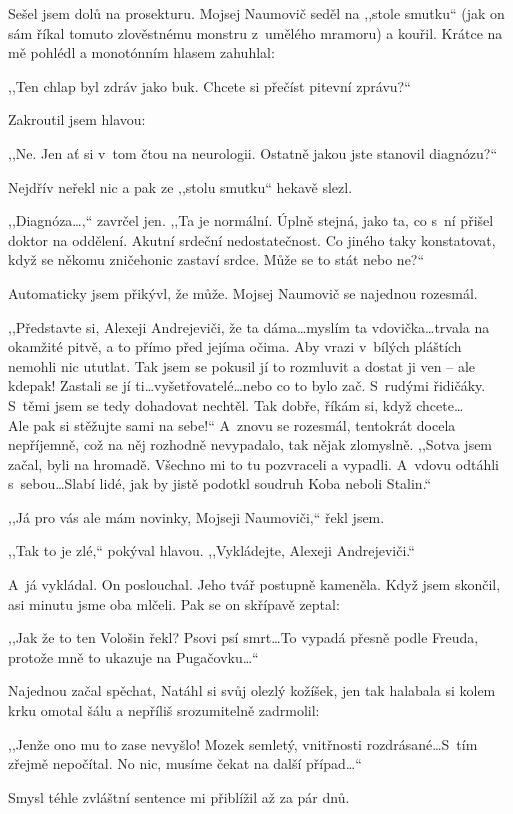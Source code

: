Sešel jsem dolů na prosekturu. Mojsej Naumovič seděl na ,,stole smutku“ (jak on sám říkal tomuto zlověstnému monstru z~umělého mramoru) a kouřil. Krátce na mě pohlédl a monotónním hlasem zahuhlal:

,,Ten chlap byl zdráv jako buk. Chcete si přečíst pitevní zprávu?“

Zakroutil jsem hlavou:

,,Ne. Jen ať si v~tom čtou na neurologii. Ostatně jakou jste stanovil diagnózu?“

Nejdřív neřekl nic a pak ze ,,stolu smutku“ hekavě slezl.

,,Diagnóza\ldots,“ zavrčel jen. ,,Ta je normální. Úplně stejná, jako ta, co s~ní přišel doktor na oddělení. Akutní srdeční nedostatečnost. Co jiného taky konstatovat, když se někomu zničehonic zastaví srdce. Může se to stát nebo ne?“

Automaticky jsem přikývl, že může. Mojsej Naumovič se najednou rozesmál.

,,Představte si, Alexeji Andrejeviči, že ta dáma\ldots myslím ta vdovička\ldots trvala na okamžité pitvě, a to přímo před jejíma očima. Aby vrazi v~bílých pláštích nemohli nic ututlat. Tak jsem se pokusil jí to rozmluvit a dostat ji ven – ale kdepak! Zastali se jí ti\ldots vyšetřovatelé\ldots nebo co to bylo zač. S~rudými řidičáky. S~těmi jsem se tedy dohadovat nechtěl. Tak dobře, říkám si, když chcete\ldots \\ Ale pak si stěžujte sami na sebe!“ A~znovu se rozesmál, tentokrát docela nepříjemně, což na něj rozhodně nevypadalo, tak nějak zlomyslně. ,,Sotva jsem začal, byli na hromadě. Všechno mi to tu pozvraceli a vypadli. A~vdovu odtáhli s~sebou\ldots Slabí lidé, jak by jistě podotkl soudruh Koba neboli Stalin.“

,,Já pro vás ale mám novinky, Mojseji Naumoviči,“ řekl jsem.

,,Tak to je zlé,“ pokýval hlavou. ,,Vykládejte, Alexeji Andrejeviči.“

A~já vykládal. On poslouchal. Jeho tvář postupně kameněla. Když jsem skončil, asi minutu jsme oba mlčeli. Pak se on skřípavě zeptal:

,,Jak že to ten Vološin řekl? Psovi psí smrt\ldots To vypadá přesně podle Freuda, protože mně to ukazuje na Pugačovku\ldots“

Najednou začal spěchat, Natáhl si svůj olezlý kožíšek, jen tak halabala si kolem krku omotal šálu a nepříliš srozumitelně zadrmolil:

,,Jenže ono mu to zase nevyšlo! Mozek semletý, vnitřnosti rozdrásané\ldots S~tím zřejmě nepočítal. No nic, musíme čekat na další případ\ldots“

Smysl téhle zvláštní sentence mi přiblížil až za pár dnů.

